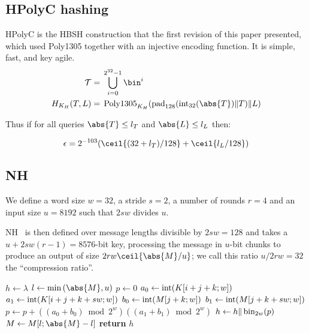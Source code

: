\documentclass[eprint.tex]{subfiles}
\begin{document}
\subsection{HPolyC hashing}
HPolyC is the HBSH construction that the first revision of this paper presented, which used
Poly1305 together with an injective encoding function.
It is simple, fast, and key agile.
\begin{align*}
\mathcal{T} ={}& \bigcup_{i=0}^{2^{32}-1}\bin^i \\
H_{K_H}(T, L) ={}& \Polydjb_{K_H}(\pad_{128}(\intify_{32}(\abs{T}) \Concat T) \Concat L) \\
\end{align*}

Thus if for all queries $\abs{T} \leq l_T$ and $\abs{L} \leq l_L$ then:

\begin{displaymath}
\epsilon = 2^{-103}(\ceil{(32 + l_T)/128} + \ceil{l_L/128})
\end{displaymath}\label{hpolycepsilon}

\subsection{NH}\label{nh}

We define a word size $w = 32$, a stride $s = 2$,
a number of rounds $r = 4$ and an input size $u = 8192$ such that $2sw$ divides $u$.

NH~\cite{umac1,umac2,rfc4418} is then defined over message
lengths divisible by $2sw = 128$
and takes a $u + 2sw(r -1) = 8576$-bit key, processing the message
in $u$-bit chunks to produce
an output of size $2rw\ceil{\abs{M}/u}$; we call this ratio $u/2rw = 32$ the ``compression ratio''.

\begin{algorithmic}[0]
    \State $h \gets \lambda$
        \State $l \gets \min{(\abs{M}, u)}$
            \State $p \gets 0$
                    \State $a_0 \gets \operatorname{int}(K[i+j+k;w])$
                    \State $a_1 \gets \operatorname{int}(K[i+j+k+sw;w])$
                    \State $b_0 \gets \operatorname{int}(M[j+k;w])$
                    \State $b_1 \gets \operatorname{int}(M[j+k+sw;w])$
                    \State $p \gets p + ((a_0 + b_0) \bmod 2^w)((a_1 + b_1) \bmod 2^w)$
                \EndFor
            \EndFor
            \State $h \gets h \Vert \operatorname{bin}_{2w}(p)$
        \EndFor
        \State $M \gets M[l;\abs{M} - l]$
    \EndWhile
    \State \textbf{return} $h$
    \EndProcedure
\end{algorithmic}
\end{document}
